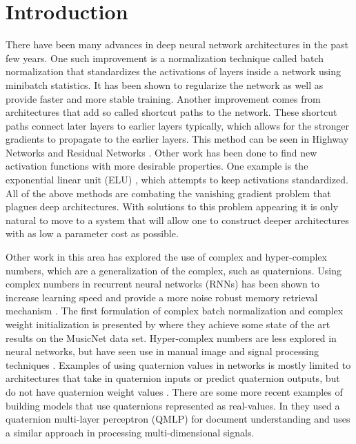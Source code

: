 \documentclass[conference]{IEEEtran}
\begin{document}
\section{Introduction}
There have been many advances in deep neural network architectures in the past few years.
One such improvement is a normalization technique called batch normalization \cite{ioffe2015batch} that standardizes the activations of layers inside a network using minibatch statistics.
It has been shown to regularize the network as well as provide faster and more stable training.
Another improvement comes from architectures that add so called shortcut paths to the network.
These shortcut paths connect later layers to earlier layers typically, which allows for the stronger gradients to propagate to the earlier layers.
This method can be seen in Highway Networks \cite{srivastava2015training} and Residual Networks  \cite{he2016deep}.
Other work has been done to find new activation functions with more desirable properties.
One example is the exponential linear unit (ELU) \cite{clevert2015fast}, which attempts to keep activations standardized.
All of the above methods are combating the vanishing gradient problem \cite{hochreiter1991untersuchungen} that plagues deep architectures.
With solutions to this problem appearing it is only natural to move to a system that will allow one to construct deeper architectures with as low a parameter cost as possible.

Other work in this area has explored the use of complex and hyper-complex numbers, which are a generalization of the complex, such as quaternions.
Using complex numbers in recurrent neural networks (RNNs) has been shown to increase learning speed and provide a more noise robust memory retrieval mechanism \cite{arjovsky2016unitary, danihelka2016associative, wisdom2016full}.
The first formulation of complex batch normalization and complex weight initialization is presented by \cite{trabelsi2017deep} where they achieve some state of the art results on the MusicNet data set.
Hyper-complex numbers are less explored in neural networks, but have seen use in manual image and signal processing techniques \cite{bulow1999hypercomplex, sangwine2000colour, bulow2001hypercomplex}.
Examples of using quaternion values in networks is mostly limited to architectures that take in quaternion inputs or predict quaternion outputs, but do not have quaternion weight values \cite{rishiyur2006neural, kendall2015posenet}. 
There are some more recent examples of building models that use quaternions represented as real-values. 
In \cite{parcollet2016quaternion} they used a quaternion multi-layer perceptron (QMLP) for document understanding and \cite{minemoto2017feed} uses a similar approach in processing multi-dimensional signals. 
\end{document}
